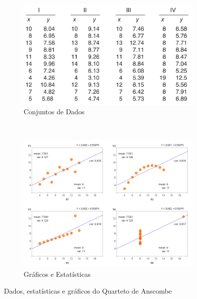 \documentclass[12pt,openright,oneside,a4paper,english,french,spanish]{abntex2}
\numberwithin{table}{section} %
\numberwithin{figure}{section} %
\begin{document}
\begin{figure}[H]
\begin{center}
\begin{subfigure}{.55\textwidth}
  \centering
  \includegraphics[width=.75\linewidth]{anscombe_dataset.png}
  \caption{Conjuntos de Dados}
  \label{fig:anscombe_data}
\end{subfigure} \\ %
\vspace{0.5cm} %
\begin{subfigure}{.75\textwidth}
  \centering
  \includegraphics[width=.95\linewidth]{anscombe_quartet_plot.png}
  \caption{Gráficos e Estatísticas}
  \label{fig:anscombe_plot_stats}
\end{subfigure}
\caption{Dados, estatísticas e gráficos do Quarteto de Anscombe}
\label{fig:anscombe}
\end{center}
\end{figure}
\end{document}
